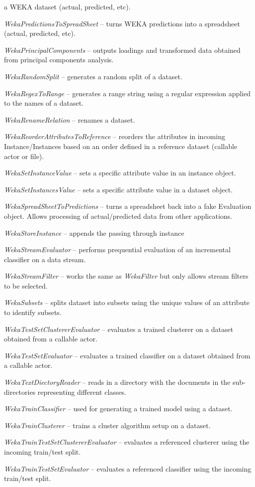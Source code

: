 \begin{tight_itemize}
	a WEKA dataset (actual, predicted, etc).
	\item \textit{WekaPredictionsToSpreadSheet} -- turns WEKA predictions into
	a spreadsheet (actual, predicted, etc).
	\item \textit{WekaPrincipalComponents} -- outputs loadings and transformed
	data obtained from principal components analysis.
	\item \textit{WekaRandomSplit} -- generates a random split of a dataset.
	\item \textit{WekaRegexToRange} -- generates a range string using a regular
	expression applied to the names of a dataset.
	\item \textit{WekaRenameRelation} -- renames a dataset.
	\item \textit{WekaReorderAttributesToReference} -- reorders the attributes
	in incoming Instance/Instances based on an order defined in a reference
	dataset (callable actor or file).
	\item \textit{WekaSetInstanceValue} -- sets a specific attribute value in
	an instance object.
	\item \textit{WekaSetInstancesValue} -- sets a specific attribute value in
	a dataset object.
	\item \textit{WekaSpreadSheetToPredictions} -- turns a spreadsheet back
	into a fake Evaluation object. Allows processing of actual/predicted data
	from other applications.
	\item \textit{WekaStoreInstance} -- appends the passing through instance
	\item \textit{WekaStreamEvaluator} -- performs prequential evaluation
	of an incremental classifier on a data stream.
	\item \textit{WekaStreamFilter} -- works the same as
	\textit{WekaFilter} but only allows stream filters to be selected.
	\item \textit{WekaSubsets} -- splits dataset into subsets using the unique
	values of an attribute to identify subsets.
	\item \textit{WekaTestSetClustererEvaluator} -- evaluates a trained
	clusterer on a dataset obtained from a callable actor.
	\item \textit{WekaTestSetEvaluator} -- evaluates a trained classifier on
	a dataset obtained from a callable actor.
	\item \textit{WekaTextDiectoryReader} -- reads in a directory with the 
	documents in the sub-directories representing different classes.
	\item \textit{WekaTrainClassifier} -- used for generating a trained
	model using a dataset.
	\item \textit{WekaTrainClusterer} -- trains a cluster algorithm setup
	on a dataset.
	\item \textit{WekaTrainTestSetClustererEvaluator} -- evaluates a referenced
	clusterer using the incoming train/test split.
	\item \textit{WekaTrainTestSetEvaluator} -- evaluates a referenced classifier
	using the incoming train/test split.
\end{tight_itemize}
